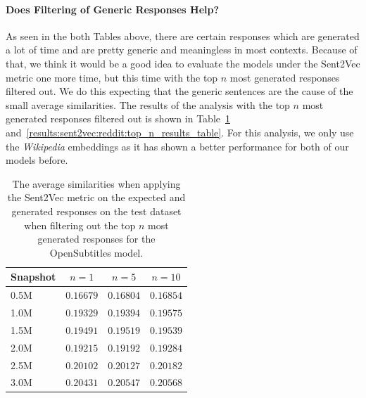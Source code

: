 \paragraph{Does Filtering of Generic Responses Help?} As seen in the both Tables above, there are certain responses which are generated a lot of time and are pretty generic and meaningless in most contexts. Because of that, we think it would be a good idea to evaluate the models under the Sent2Vec metric one more time, but this time with the top $n$ most generated responses filtered out. We do this expecting that the generic sentences are the cause of the small average similarities. The results of the analysis with the top $n$ most generated responses filtered out is shown in Table~\ref{results:sent2vec:opensubtitles:top_n_results_table} and~\ref{results:sent2vec:reddit:top_n_results_table}. For this analysis, we only use the \emph{Wikipedia} embeddings as it has shown a better performance for both of our models before.
\\
\begin{table}[H]
	\centering
	\begin{adjustbox}{max width=\textwidth}
		\begin{tabular}{lccc}
			\toprule
			Snapshot & $n = 1$ & $n = 5$ & $n = 10$\\
			\midrule
			0.5M & $0.16679$ & $0.16804$ & $0.16854$\\
			1.0M & $0.19329$ & $0.19394$ & $0.19575$\\
			1.5M & $0.19491$ & $0.19519$ & $0.19539$\\
			2.0M & $0.19215$ & $0.19192$ & $0.19284$\\
			2.5M & $0.20102$ & $0.20127$ & $0.20182$\\
			3.0M & $0.20431$ & $0.20547$ & $0.20568$\\
			\bottomrule
		\end{tabular}
	\end{adjustbox}
	\caption{The average similarities when applying the Sent2Vec metric on the expected and generated responses on the test dataset when filtering out the top $n$ most generated responses for the OpenSubtitles model.}
	\label{results:sent2vec:opensubtitles:top_n_results_table}
\end{table}

